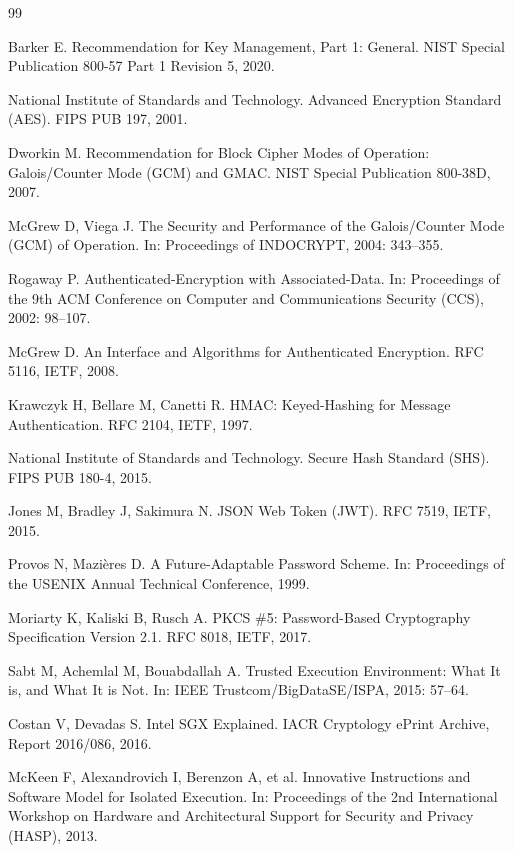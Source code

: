 \begin{thebibliography}{99}

 Barker E. Recommendation for Key Management, Part 1: General. NIST Special Publication 800-57 Part 1 Revision 5, 2020.

 National Institute of Standards and Technology. Advanced Encryption Standard (AES). FIPS PUB 197, 2001.

 Dworkin M. Recommendation for Block Cipher Modes of Operation: Galois/Counter Mode (GCM) and GMAC. NIST Special Publication 800-38D, 2007.

 McGrew D, Viega J. The Security and Performance of the Galois/Counter Mode (GCM) of Operation. In: Proceedings of INDOCRYPT, 2004: 343--355.

 Rogaway P. Authenticated-Encryption with Associated-Data. In: Proceedings of the 9th ACM Conference on Computer and Communications Security (CCS), 2002: 98--107.

 McGrew D. An Interface and Algorithms for Authenticated Encryption. RFC 5116, IETF, 2008.

 Krawczyk H, Bellare M, Canetti R. HMAC: Keyed-Hashing for Message Authentication. RFC 2104, IETF, 1997.

 National Institute of Standards and Technology. Secure Hash Standard (SHS). FIPS PUB 180-4, 2015.

 Jones M, Bradley J, Sakimura N. JSON Web Token (JWT). RFC 7519, IETF, 2015.

 Provos N, Mazi\`eres D. A Future-Adaptable Password Scheme. In: Proceedings of the USENIX Annual Technical Conference, 1999.

 Moriarty K, Kaliski B, Rusch A. PKCS \#5: Password-Based Cryptography Specification Version 2.1. RFC 8018, IETF, 2017.

 Sabt M, Achemlal M, Bouabdallah A. Trusted Execution Environment: What It is, and What It is Not. In: IEEE Trustcom/BigDataSE/ISPA, 2015: 57--64.

 Costan V, Devadas S. Intel SGX Explained. IACR Cryptology ePrint Archive, Report 2016/086, 2016.

 McKeen F, Alexandrovich I, Berenzon A, et al. Innovative Instructions and Software Model for Isolated Execution. In: Proceedings of the 2nd International Workshop on Hardware and Architectural Support for Security and Privacy (HASP), 2013.


\end{thebibliography}
